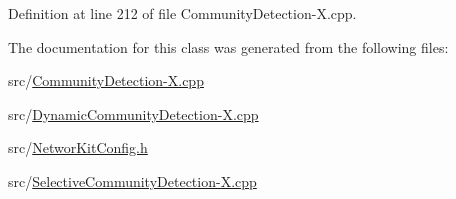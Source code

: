 Definition at line 212 of file Community\-Detection-\/\-X.\-cpp.



The documentation for this class was generated from the following files\-:\begin{DoxyCompactItemize}
\item 
src/\hyperlink{_community_detection-_x_8cpp}{Community\-Detection-\/\-X.\-cpp}\item 
src/\hyperlink{_dynamic_community_detection-_x_8cpp}{Dynamic\-Community\-Detection-\/\-X.\-cpp}\item 
src/\hyperlink{_networ_kit_config_8h}{Networ\-Kit\-Config.\-h}\item 
src/\hyperlink{_selective_community_detection-_x_8cpp}{Selective\-Community\-Detection-\/\-X.\-cpp}\end{DoxyCompactItemize}
